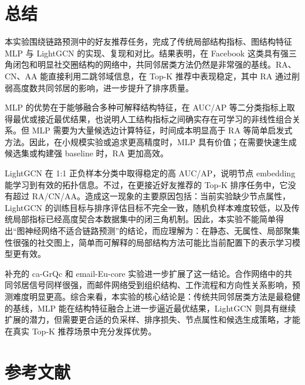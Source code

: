 \documentclass[UTF8,zihao=-4]{ctexart}
\begin{document}
\section{总结}

本实验围绕链路预测中的好友推荐任务，完成了传统局部结构指标、图结构特征 MLP 与 LightGCN 的实现、复现和对比。结果表明，在 Facebook 这类具有强三角闭包和明显社交圈结构的网络中，共同邻居类方法仍然是非常强的基线。RA、CN、AA 能直接利用二跳邻域信息，在 Top-K 推荐中表现稳定，其中 RA 通过削弱高度数共同邻居的影响，进一步提升了排序质量。

MLP 的优势在于能够融合多种可解释结构特征，在 AUC/AP 等二分类指标上取得最优或接近最优结果，也说明人工结构指标之间确实存在可学习的非线性组合关系。但 MLP 需要为大量候选边计算特征，时间成本明显高于 RA 等简单启发式方法。因此，在小规模实验或追求更高精度时，MLP 具有价值；在需要快速生成候选集或构建强 baseline 时，RA 更加高效。

LightGCN 在 1:1 正负样本分类中取得稳定的高 AUC/AP，说明节点 embedding 能学习到有效的拓扑信息。不过，在更接近好友推荐的 Top-K 排序任务中，它没有超过 RA/CN/AA。造成这一现象的主要原因包括：当前实验缺少节点属性，LightGCN 的训练目标与排序评估目标不完全一致，随机负样本难度较低，以及传统局部指标已经高度契合本数据集中的闭三角机制。因此，本实验不能简单得出“图神经网络不适合链路预测”的结论，而应理解为：在静态、无属性、局部聚集性很强的社交图上，简单而可解释的局部结构方法可能比当前配置下的表示学习模型更有效。

补充的 ca-GrQc 和 email-Eu-core 实验进一步扩展了这一结论。合作网络中的共同邻居信号同样很强，而邮件网络受到组织结构、工作流程和方向性关系影响，预测难度明显更高。综合来看，本实验的核心结论是：传统共同邻居类方法是最稳健的基线，MLP 能在结构特征融合上进一步逼近最优结果，LightGCN 则具有继续扩展的潜力，但需要更合适的负采样、排序损失、节点属性和候选生成策略，才能在真实 Top-K 推荐场景中充分发挥优势。

\section{参考文献}
\end{document}
